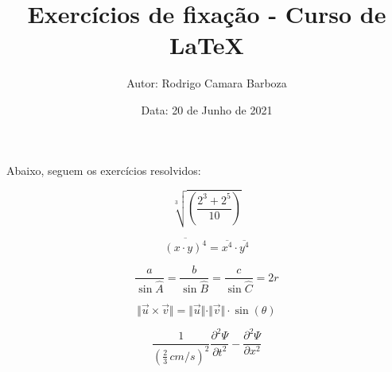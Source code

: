 \documentclass[a4paper, 12pt]{article}
\title{\textbf{Exercícios de fixação - Curso de LaTeX}}
\author{Autor: Rodrigo Camara Barboza}
\date{Data: 20 de Junho de 2021}
\begin{document}
\maketitle

Abaixo, seguem os exercícios resolvidos:

\begin{equation}
\sqrt[3]{\left( \frac{2^{3} + 2^{5}}{10}\right)}
\end{equation}

\begin{equation}
\overline{(x \cdot y)^{4}} = \overline{x^{4}} \cdot \overline{y^{4}}
\end{equation}

\begin{equation}
\frac{a}{\sin\widehat{A}} = \frac{b}{\sin\widehat{B}} = \frac{c}{\sin\widehat{C}} = 2r
\end{equation}

\begin{equation}
\Vert \vec{u} \times \vec{v} \Vert = \Vert \vec{u} \Vert \cdot \Vert \vec{v} \Vert \cdot \sin(\theta)
\end{equation}

\begin{equation}
\frac{1}{\left(\frac{2}{3} \, cm/s\right)^{2}} \frac{\partial^{2}\Psi}{\partial t^{2}} - \frac{\partial^{2}\Psi}{\partial x^2}
\end{equation}
\end{document}
